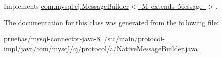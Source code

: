 Implements \mbox{\hyperlink{interfacecom_1_1mysql_1_1cj_1_1_message_builder_a592efa3bace2a15138d4bed34dd37e28}{com.\+mysql.\+cj.\+Message\+Builder$<$ M extends Message $>$}}.



The documentation for this class was generated from the following file\+:\begin{DoxyCompactItemize}
\item 
pruebas/mysql-\/connector-\/java-\/8../src/main/protocol-\/impl/java/com/mysql/cj/protocol/a/\mbox{\hyperlink{_native_message_builder_8java}{Native\+Message\+Builder.\+java}}\end{DoxyCompactItemize}

